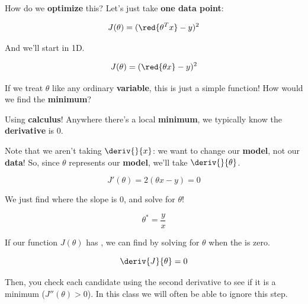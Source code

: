         How do we \textbf{optimize} this? Let's just take \textbf{one data point}:
        
        \begin{equation}
            J(\theta) = (\red{ \theta^T x  } - y )^2
        \end{equation}
        
        And we'll start in 1D.
        
        \begin{equation}
            J(\theta) = (\red{\theta x}   - y )^2
        \end{equation}
        
        If we treat $\theta$ like any ordinary \textbf{variable}, this is just a simple function! How would we find the \textbf{minimum}? 
        
        Using \textbf{calculus}! Anywhere there's a local \textbf{minimum}, we typically know the \textbf{derivative} is 0.
        
        Note that we aren't taking $\deriv{}{x}$: we want to change our \textbf{model}, not our \textbf{data}! So, since $\theta$ represents our \textbf{model}, we'll take $\deriv{}{\theta}$.
        
        \begin{equation}
            J'(\theta) = 2(\theta x - y ) = 0
        \end{equation}
        
        We just find where the slope is 0, and solve for $\theta$!
        
        \begin{equation}
            \theta^* = \frac{y}{x}
        \end{equation}
        
        \begin{concept}
            
            If our function $J(\theta)$ has , we can  find  by solving for $\theta$ when the  is zero.
            
            \begin{equation*}
                \deriv{J}{\theta}=0
            \end{equation*}
            
            Then, you check each candidate using the second derivative to see if it is a minimum ($J''(\theta)>0$). In this class we will often be able to ignore this step.
        \end{concept}
        
